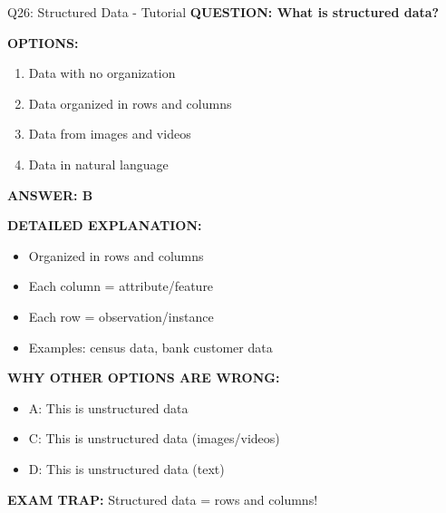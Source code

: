 \documentclass[8pt]{beamer}
\begin{document}
	\begin{frame}{Q26: Structured Data - Tutorial}
		\fontsize{6.5}{7.5}\selectfont
		\textbf{QUESTION: What is structured data?}
		
		\vspace{0.1cm}
		\textbf{OPTIONS:}
		\begin{enumerate}
			\item Data with no organization
			\item Data organized in rows and columns
			\item Data from images and videos
			\item Data in natural language
		\end{enumerate}
		
		\vspace{0.1cm}
		\textcolor{myblue}{\textbf{ANSWER: B}}
		
		\vspace{0.1cm}
		\textbf{DETAILED EXPLANATION:}
		\begin{itemize}
			\item Organized in rows and columns
			\item Each column = attribute/feature
			\item Each row = observation/instance
			\item Examples: census data, bank customer data
		\end{itemize}
		
		\vspace{0.1cm}
		\textcolor{myred}{\textbf{WHY OTHER OPTIONS ARE WRONG:}}
		\begin{itemize}
			\item \textcolor{myred}{A:} This is unstructured data
			\item \textcolor{myred}{C:} This is unstructured data (images/videos)
			\item \textcolor{myred}{D:} This is unstructured data (text)
		\end{itemize}
		
		\textcolor{myred}{\textbf{EXAM TRAP:}} Structured data = \textcolor{myblue}{rows and columns}!
	\end{frame}
	
\end{document}
